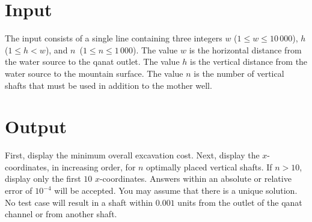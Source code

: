 \section*{Input}
The input consists of a single line containing three integers $w$
($1 \le w \le 10\,000$), $h$ ($1 \le h < w$), and $n$~($1 \le n \le
1\,000$). The value $w$ is the horizontal distance from the water
source to the qanat outlet. The value $h$ is the vertical distance
from the water source to the mountain surface. The value $n$ is the
number of vertical shafts that must be used in addition to the mother
well.

\section*{Output}
First, display the minimum overall excavation cost.
Next, display the $x$-coordinates, in increasing order, for
$n$ optimally placed vertical shafts.  If $n > 10$, display only the first $10$ $x$-coordinates.
Answers within an absolute or relative error of $10^{-4}$ will be 
accepted.  You may assume that there is a unique solution.
No test case will result in a shaft within $0.001$ 
units from the outlet of the qanat channel or from another shaft.
